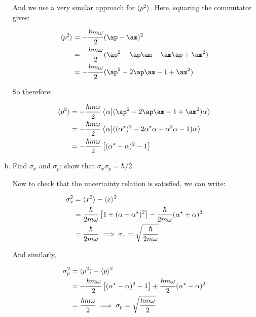 \documentclass[10pt]{article}
\begin{document}
\begin{enumerate}[(a)]
\begin{solution}
            And we use a very similar approach for $\langle p^2 \rangle$. Here, squaring the commutator gives: 

            \begin{align*}
                \mean{p^2} &= -\frac{\hbar m \omega}{2}(\ap - \am)^2\\
                &= -\frac{\hbar m \omega}{2}(\ap^2 - \ap \am - \am \ap + \am^2)\\
                &= -\frac{\hbar m \omega}{2}(\ap^2 - 2\ap \am - 1 + \am^2)
            \end{align*}

            So therefore: 

            \begin{align*}
                \mean{p^2} &= -\frac{\hbar m \omega}{2}\braket{\alpha}{(\ap^2 - 2\ap \am -1 + \am^2)\alpha}\\
                &= -\frac{\hbar m \omega}{2}\braket{\alpha}{((\alpha^\star)^2 - 2\alpha^\star \alpha + \alpha^2 \alpha - 1) \alpha}\\
                &= -\frac{\hbar m \omega}{2}\left[(\alpha^\star - \alpha)^2 - 1\right]
            \end{align*} 
        \end{solution}


        \item Find $\sigma_x$ and $\sigma_p$; show that $\sigma_x\sigma_p = \hbar/2$. 
        
        \begin{solution}
            Now to check that the uncertainty relation is satisfied, we can write:

            \begin{align*}
                \sigma_x^2 &= \langle x^2 \rangle - \langle x \rangle^2\\
                &= \frac{\hbar}{2 m \omega} \left[ 1 + (\alpha + \alpha^\star)^2\right] - \frac{\hbar}{2m \omega} (\alpha^\star + \alpha)^2 \\
                &= \frac{\hbar}{2m \omega} \implies \sigma_x = \sqrt{\frac{\hbar}{2m\omega}}
            \end{align*}

            And similarly, 

            \begin{align*}
                \sigma_p^2 &= \langle p^2 \rangle - \langle p \rangle^2\\
                &= -\frac{\hbar m \omega}{2} \left[(\alpha^\star -\alpha)^2 - 1\right] + \frac{\hbar m \omega}{2}(\alpha^\star - \alpha)^2\\
                &= \frac{\hbar m \omega}{2} \implies \sigma_p = \sqrt{\frac{\hbar m \omega}{2}}
            \end{align*}


\end{solution}
\end{enumerate}
\end{document}
